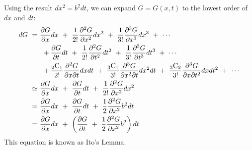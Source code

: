 \documentclass[uplatex,a4j,12pt,dvipdfmx]{jsarticle}
\begin{document}
Using the result $dx^{2} = b^{2} dt$, we can expand $G=G(x,t)$ to the lowest order of $dx$ and $dt$:
\begin{align}
	d G
	\ =      & \
	\dfrac{\partial G}{\partial x} d x
	\ + \
	\dfrac{1}{2!} \dfrac{\partial^{2} G}{\partial x^{2}} d x^{2}
	\ + \
	\dfrac{1}{3!} \dfrac{\partial^{3} G}{\partial x^{3}} d x^{3}
	\ + \
	\cdots
	\\
	         & \ \ +
	\dfrac{\partial G}{\partial t} d t
	\ + \
	\dfrac{1}{2!} \dfrac{\partial^{2} G}{\partial t^{2}} d t^{2}
	\ + \
	\dfrac{1}{3!} \dfrac{\partial^{3} G}{\partial t^{3}} d t^{3}
	\ + \
	\cdots
	\\
	         & \ \ +
	\dfrac{ {}_2 {\rm C}_{1} }{2!}
	\dfrac{\partial^{2} G}{\partial x \partial t } d x d t
	\ + \
	\dfrac{ {}_3 {\rm C}_{1} }{3!}
	\dfrac{\partial^{3} G}{\partial x^{2} \partial t } d x^{2} d t
	\ + \
	\dfrac{ {}_3 {\rm C}_{2} }{3!}
	\dfrac{\partial^{3} G}{\partial x \partial t^{2} } d x d t^{2}
	\ + \
	\cdots
	\\
	\ \simeq & \
	\dfrac{\partial G}{\partial x} d x
	\ + \
	\dfrac{\partial G}{\partial t} d t
	\ + \
	\dfrac{1}{2!} \dfrac{\partial^{2} G}{\partial x^{2}} d x^{2}
	\\
	\ =      & \
	\dfrac{\partial G}{\partial x} d x
	\ + \
	\dfrac{\partial G}{\partial t} d t
	\ + \
	\dfrac{1}{2} \dfrac{\partial^{2} G}{\partial x^{2}} b^{2}dt
	\\
	\ =      & \
	\dfrac{\partial G}{\partial x} d x
	\ + \
	\left(
	\dfrac{\partial G}{\partial t}
	\ + \
	\dfrac{1}{2} \dfrac{\partial^{2} G}{\partial x^{2}} b^{2}
	\right)
	dt
\end{align}
This equation is known as Ito's Lemma.
\end{document}
